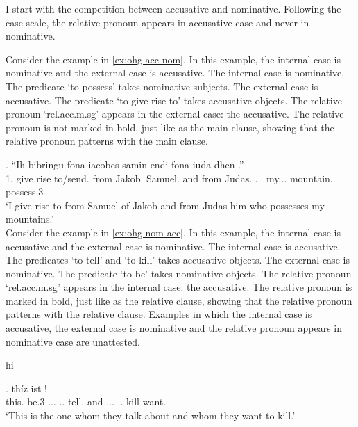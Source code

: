 I start with the competition between accusative and nominative. Following the case scale, the relative pronoun appears in accusative case and never in nominative.

Consider the example in \ref{ex:ohg-acc-nom}. In this example, the internal case is nominative and the external case is accusative.
The internal case is nominative. The predicate  `to possess' takes nominative subjects.
The external case is accusative. The predicate  `to give rise to' takes accusative objects.
The relative pronoun  `\ac{rel}.\ac{acc}.\ac{m}.\ac{sg}' appears in the external case: the accusative. The relative pronoun is not marked in bold, just like as the main clause, showing that the relative pronoun patterns with the main clause.


\exg. ``Ih bibringu fona iacobes samin endi fona iuda dhen   .''\\
1. {give rise to/send}.\scsub{[acc]} from Jakob. Samuel. and from Judas. ... my... mountain.. possess.3\scsub{[nom]}\\
`I give rise to from Samuel of Jakob and from Judas him who possesses my mountains.' \label{ex:ohg-acc-nom}\\

Consider the example in \ref{ex:ohg-nom-acc}. In this example, the internal case is accusative and the external case is nominative.
The internal case is accusative. The predicates  `to tell' and  `to kill' takes accusative objects.
The external case is nominative. The predicate  `to be' takes nominative objects.
The relative pronoun  `\ac{rel}.\ac{acc}.\ac{m}.\ac{sg}' appears in the internal case: the accusative. The relative pronoun is marked in bold, just like as the relative clause, showing that the relative pronoun patterns with the relative clause.
Examples in which the internal case is accusative, the external case is nominative and the relative pronoun appears in nominative case are unattested.

hi

\exg. thíz ist        !\\
this. be.3\scsub{[nom]} ... .. tell.\scsub{[acc]}
and ... .. kill\scsub{[acc]} want.\\
`This is the one whom they talk about and whom they want to kill.' \label{ex:ohg-nom-acc}

